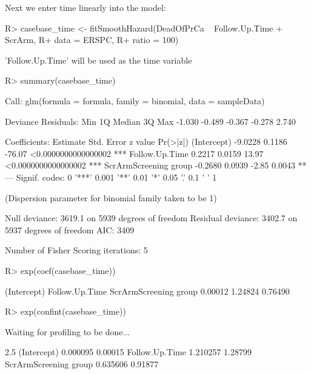 \documentclass[article]{jss}
\begin{document}
Next we enter time linearly into the model:

\begin{CodeChunk}

\begin{CodeInput}
R> casebase_time <- fitSmoothHazard(DeadOfPrCa ~ Follow.Up.Time + ScrArm, 
R+                                  data = ERSPC, 
R+                                  ratio = 100)
\end{CodeInput}

\begin{CodeOutput}
'Follow.Up.Time' will be used as the time variable
\end{CodeOutput}

\begin{CodeInput}
R> summary(casebase_time)
\end{CodeInput}

\begin{CodeOutput}

Call:
glm(formula = formula, family = binomial, data = sampleData)

Deviance Residuals: 
   Min      1Q  Median      3Q     Max  
-1.030  -0.489  -0.367  -0.278   2.740  

Coefficients:
                      Estimate Std. Error z value            Pr(>|z|)    
(Intercept)            -9.0228     0.1186  -76.07 <0.0000000000000002 ***
Follow.Up.Time          0.2217     0.0159   13.97 <0.0000000000000002 ***
ScrArmScreening group  -0.2680     0.0939   -2.85              0.0043 ** 
---
Signif. codes:  0 '***' 0.001 '**' 0.01 '*' 0.05 '.' 0.1 ' ' 1

(Dispersion parameter for binomial family taken to be 1)

    Null deviance: 3619.1  on 5939  degrees of freedom
Residual deviance: 3402.7  on 5937  degrees of freedom
AIC: 3409

Number of Fisher Scoring iterations: 5
\end{CodeOutput}

\begin{CodeInput}
R> exp(coef(casebase_time))
\end{CodeInput}

\begin{CodeOutput}
          (Intercept)        Follow.Up.Time ScrArmScreening group 
              0.00012               1.24824               0.76490 
\end{CodeOutput}

\begin{CodeInput}
R> exp(confint(casebase_time))
\end{CodeInput}

\begin{CodeOutput}
Waiting for profiling to be done...
\end{CodeOutput}

\begin{CodeOutput}
                         2.5 %
(Intercept)           0.000095 0.00015
Follow.Up.Time        1.210257 1.28799
ScrArmScreening group 0.635606 0.91877
\end{CodeOutput}
\end{CodeChunk}
\end{document}

